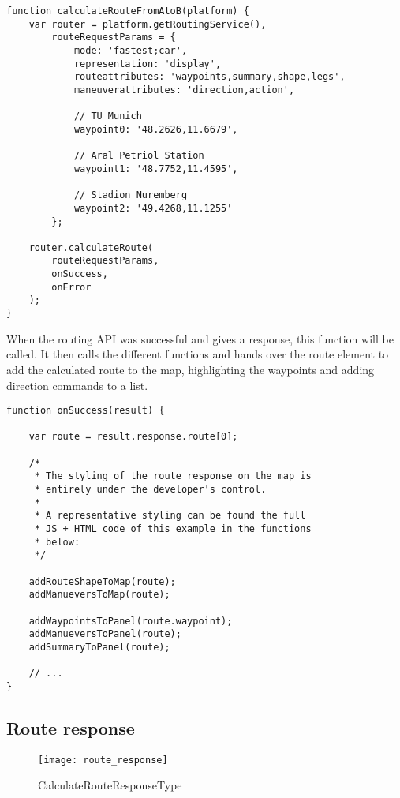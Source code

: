 \begin{verbatim}
function calculateRouteFromAtoB(platform) {
    var router = platform.getRoutingService(),
        routeRequestParams = {
            mode: 'fastest;car',
            representation: 'display',
            routeattributes: 'waypoints,summary,shape,legs',
            maneuverattributes: 'direction,action',

            // TU Munich
            waypoint0: '48.2626,11.6679',

            // Aral Petriol Station
            waypoint1: '48.7752,11.4595',

            // Stadion Nuremberg
            waypoint2: '49.4268,11.1255'
        };

    router.calculateRoute(
        routeRequestParams,
        onSuccess,
        onError
    );
}
\end{verbatim}

When the routing API was successful and gives a response, this function will be called. It then calls the different functions and hands over the route element to add the calculated route to the map, highlighting the waypoints and adding direction commands to a list. 

\begin{verbatim}
function onSuccess(result) {

    var route = result.response.route[0];

    /*
     * The styling of the route response on the map is
     * entirely under the developer's control.
     *
     * A representative styling can be found the full
     * JS + HTML code of this example in the functions
     * below:
     */

    addRouteShapeToMap(route);
    addManueversToMap(route);

    addWaypointsToPanel(route.waypoint);
    addManueversToPanel(route);
    addSummaryToPanel(route);

    // ...
}

\end{verbatim}


\subsection{Route response}

\begin{figure}[htp]
\centering
\texttt{[image: route\_response]}
\caption{CalculateRouteResponseType \cite{driver-14}}
\end{figure}

